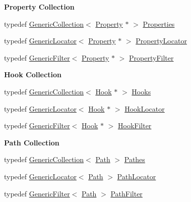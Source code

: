 \begin{Indent}\textbf{ Property Collection}\par
\begin{DoxyCompactItemize}
\item 
typedef \mbox{\hyperlink{classHurricane_1_1GenericCollection}{Generic\+Collection}}$<$ \mbox{\hyperlink{classHurricane_1_1Property}{Property}} $\ast$ $>$ \mbox{\hyperlink{namespaceHurricane_afd7bca6dad4be54b7c03b0463e6c0004}{Properties}}
\item 
typedef \mbox{\hyperlink{classHurricane_1_1GenericLocator}{Generic\+Locator}}$<$ \mbox{\hyperlink{classHurricane_1_1Property}{Property}} $\ast$ $>$ \mbox{\hyperlink{namespaceHurricane_a91d71616b5784225dfd4296487e49c07}{Property\+Locator}}
\item 
typedef \mbox{\hyperlink{classHurricane_1_1GenericFilter}{Generic\+Filter}}$<$ \mbox{\hyperlink{classHurricane_1_1Property}{Property}} $\ast$ $>$ \mbox{\hyperlink{namespaceHurricane_a9e98e66d188d506145a5e92045691777}{Property\+Filter}}
\end{DoxyCompactItemize}
\end{Indent}
\begin{Indent}\textbf{ Hook Collection}\par
\begin{DoxyCompactItemize}
\item 
typedef \mbox{\hyperlink{classHurricane_1_1GenericCollection}{Generic\+Collection}}$<$ \mbox{\hyperlink{classHurricane_1_1Hook}{Hook}} $\ast$ $>$ \mbox{\hyperlink{namespaceHurricane_a9dcd9b74dc5e2b51bec7a13c25807e02}{Hooks}}
\item 
typedef \mbox{\hyperlink{classHurricane_1_1GenericLocator}{Generic\+Locator}}$<$ \mbox{\hyperlink{classHurricane_1_1Hook}{Hook}} $\ast$ $>$ \mbox{\hyperlink{namespaceHurricane_aca3a5babe6265eb9f140112d8e8b79e6}{Hook\+Locator}}
\item 
typedef \mbox{\hyperlink{classHurricane_1_1GenericFilter}{Generic\+Filter}}$<$ \mbox{\hyperlink{classHurricane_1_1Hook}{Hook}} $\ast$ $>$ \mbox{\hyperlink{namespaceHurricane_a9287de05984b91e55592a77e8d394324}{Hook\+Filter}}
\end{DoxyCompactItemize}
\end{Indent}
\begin{Indent}\textbf{ Path Collection}\par
\begin{DoxyCompactItemize}
\item 
typedef \mbox{\hyperlink{classHurricane_1_1GenericCollection}{Generic\+Collection}}$<$ \mbox{\hyperlink{classHurricane_1_1Path}{Path}} $>$ \mbox{\hyperlink{namespaceHurricane_a77e8a0f11b7d0d65a47a592f7bdfd061}{Pathes}}
\item 
typedef \mbox{\hyperlink{classHurricane_1_1GenericLocator}{Generic\+Locator}}$<$ \mbox{\hyperlink{classHurricane_1_1Path}{Path}} $>$ \mbox{\hyperlink{namespaceHurricane_a4077fe144cc9efa686ec63667b7dd9bf}{Path\+Locator}}
\item 
typedef \mbox{\hyperlink{classHurricane_1_1GenericFilter}{Generic\+Filter}}$<$ \mbox{\hyperlink{classHurricane_1_1Path}{Path}} $>$ \mbox{\hyperlink{namespaceHurricane_af42ed7a6acaba43b9d5f30b789105bc1}{Path\+Filter}}
\end{DoxyCompactItemize}
\end{Indent}
